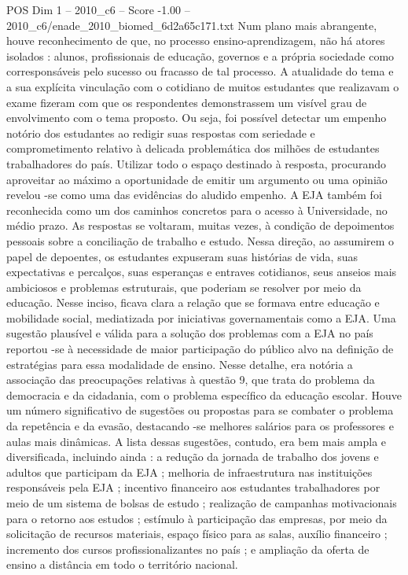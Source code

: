 \begin{textsample}{POS Dim 1 – 2010\_c6 – Score -1.00 – 2010\_c6/enade\_2010\_biomed\_6d2a65c171.txt}
Num plano mais abrangente, houve reconhecimento de que, no processo ensino-aprendizagem, não há atores isolados : alunos, profissionais de educação, governos e a própria sociedade como corresponsáveis pelo sucesso ou fracasso de tal processo.
A atualidade do tema e a sua explícita vinculação com o cotidiano de muitos estudantes que realizavam o exame fizeram com que os respondentes demonstrassem um visível grau de envolvimento com o tema proposto.
Ou seja, foi possível detectar um empenho notório dos estudantes ao redigir suas respostas com seriedade e comprometimento relativo à delicada problemática dos milhões de estudantes trabalhadores do país.
Utilizar todo o espaço destinado à resposta, procurando aproveitar ao máximo a oportunidade de emitir um argumento ou uma opinião revelou -se como uma das evidências do aludido empenho.
A EJA também foi reconhecida como um dos caminhos concretos para o acesso à Universidade, no médio prazo.
As respostas se voltaram, muitas vezes, à condição de depoimentos pessoais sobre a conciliação de trabalho e estudo.
Nessa direção, ao assumirem o papel de depoentes, os estudantes expuseram suas histórias de vida, suas expectativas e percalços, suas esperanças e entraves cotidianos, seus anseios mais ambiciosos e problemas estruturais, que poderiam se resolver por meio da educação.
Nesse inciso, ficava clara a relação que se formava entre educação e mobilidade social, mediatizada por iniciativas governamentais como a EJA.
Uma sugestão plausível e válida para a solução dos problemas com a EJA no país reportou -se à necessidade de maior participação do público alvo na definição de estratégias para essa modalidade de ensino.
Nesse detalhe, era notória a associação das preocupações relativas à questão 9, que trata do problema da democracia e da cidadania, com o problema específico da educação escolar.
Houve um número significativo de sugestões ou propostas para se combater o problema da repetência e da evasão, destacando -se melhores salários para os professores e aulas mais dinâmicas.
A lista dessas sugestões, contudo, era bem mais ampla e diversificada, incluindo ainda : a redução da jornada de trabalho dos jovens e adultos que participam da EJA ; melhoria de infraestrutura nas instituições responsáveis pela EJA ; incentivo financeiro aos estudantes trabalhadores por meio de um sistema de bolsas de estudo ; realização de campanhas motivacionais para o retorno aos estudos ; estímulo à participação das empresas, por meio da solicitação de recursos materiais, espaço físico para as salas, auxílio financeiro ; incremento dos cursos profissionalizantes no país ; e ampliação da oferta de ensino a distância em todo o território nacional.

\end{textsample}
